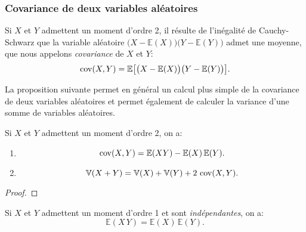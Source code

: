 \sld{\vfill\pagebreak[5]}%

\subsubsection{Covariance de deux variables aléatoires}

\begin{definition}
Si $X$ et $Y$ admettent un moment d'ordre 2, il résulte de l'inégalité de Cauchy-Schwarz que la variable aléatoire $\big( X - \mathbb{E}(X) \big) \big( Y - \mathbb{E}(Y) \big)$ admet une moyenne, que nous appelons \emph{covariance} de $X$ et $Y$:
\[ \operatorname{cov} (X,Y) = \mathbb{E} \big[ \big( X - \mathbb{E}(X) \big) \big( Y - \mathbb{E}(Y) \big) \big] .\]
\end{definition}


La proposition suivante permet en général un calcul plus simple de la covariance de deux variables aléatoires et permet également de calculer la variance d'une somme de variables aléatoires.

\begin{proposition}
Si $X$ et $Y$ admettent un moment d'ordre 2, on a:
\begin{enumerate}[label=(\roman*)]
	\item \[ \operatorname{cov} (X,Y) = \mathbb{E} (XY) - \mathbb{E}(X) \, \mathbb{E}(Y) .\]
	 \item \[ \mathbb{V}(X+Y)= \mathbb{V}(X) + \mathbb{V}(Y) + 2 \, \operatorname{cov} (X,Y).\]
\end{enumerate}
\end{proposition}

\begin{proof}
	\pl{\rep{4cm}}
\end{proof}
\sld{\vfill\pagebreak[5]}%
\begin{proposition}
Si $X$ et $Y$ admettent un moment d'ordre 1 et sont \emph{indépendantes}, on a:
\[ \mathbb{E}(X \, Y)= \mathbb{E}(X) \, \mathbb{E}(Y) .\]
\end{proposition}

